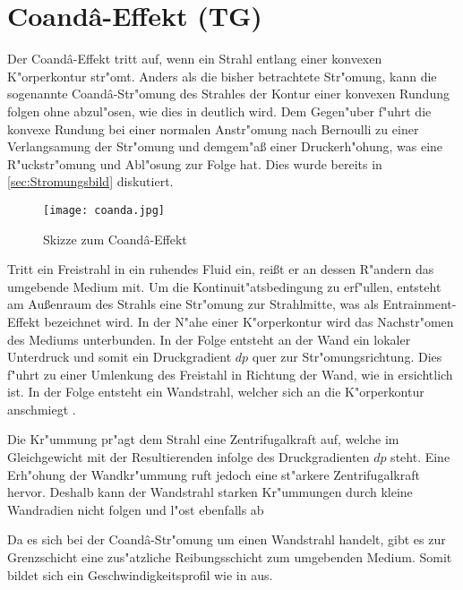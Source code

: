 \section{Coand\^{a}-Effekt (TG)}

Der Coand\^{a}-Effekt tritt auf, wenn ein Strahl entlang einer konvexen K"orperkontur str"omt. Anders als die bisher betrachtete Str"omung, kann die sogenannte Coand\^{a}-Str"omung des Strahles der Kontur einer konvexen Rundung folgen ohne abzul"osen, wie dies in  deutlich wird. Dem Gegen"uber f"uhrt die konvexe Rundung bei einer normalen Anstr"omung nach Bernoulli zu einer Verlangsamung der Str"omung und demgem"a\ss{} einer Druckerh"ohung, was eine R"uckstr"omung und Abl"osung zur Folge hat. Dies wurde bereits in \ref{sec:Stromungsbild} diskutiert.

\begin{figure}[h]
	\centering
	\texttt{[image: coanda.jpg]}
	\caption{Skizze zum Coand\^{a}-Effekt \cite{Stadlberger.2016}}
	\label{fig:coanda}
\end{figure}

Tritt ein Freistrahl in ein ruhendes Fluid ein, rei\ss{}t er an dessen R"andern das umgebende Medium mit. Um die Kontinuit"atsbedingung zu erf"ullen, entsteht am Au\ss{}enraum des Strahls eine Str"omung zur Strahlmitte, was als Entrainment-Effekt bezeichnet wird. In der N"ahe einer K"orperkontur wird das Nachstr"omen des Mediums unterbunden. In der Folge entsteht an der Wand ein lokaler Unterdruck und somit ein Druckgradient $dp$ quer zur Str"omungsrichtung. Dies f"uhrt zu einer Umlenkung des Freistahl in Richtung der Wand, wie in  ersichtlich ist. In der Folge entsteht ein Wandstrahl, welcher sich an die K"orperkontur anschmiegt \cite{Fernholz.1966}. 

Die Kr"ummung pr"agt dem Strahl eine Zentrifugalkraft auf, welche im Gleichgewicht mit der Resultierenden infolge des Druckgradienten $dp$ steht. Eine Erh"ohung der Wandkr"ummung ruft jedoch eine st"arkere Zentrifugalkraft hervor. Deshalb kann der Wandstrahl starken Kr"ummungen durch kleine Wandradien nicht folgen und l"ost ebenfalls ab \cite{Riedel.1971}

Da es sich bei der Coand\^{a}-Str"omung um einen Wandstrahl handelt, gibt es zur Grenzschicht eine zus"atzliche Reibungsschicht zum umgebenden Medium. Somit bildet sich ein Geschwindigkeitsprofil wie in  aus. \\


